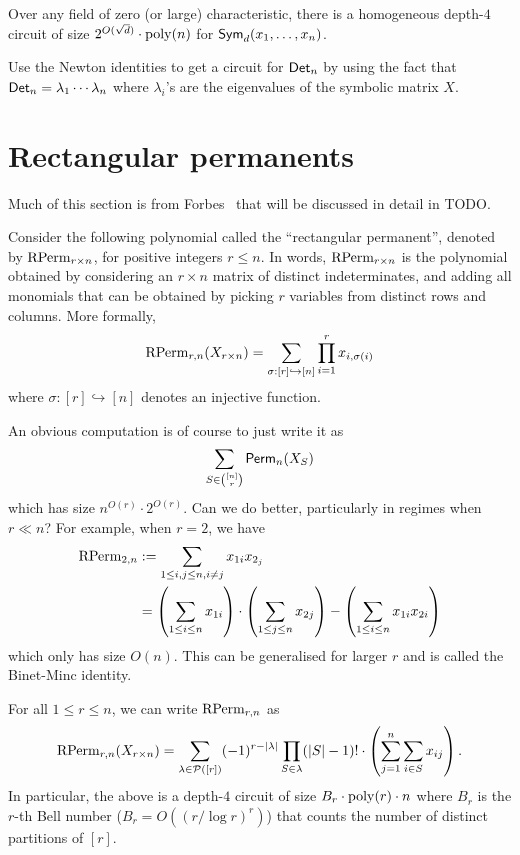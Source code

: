 \begin{lemma}\label{lem:hom-d4-ckt-esym}
Over any field of zero (or large) characteristic, there is a homogeneous depth-$4$ circuit of size $2^{O(\sqrt{d})} \cdot \operatorname{poly}(n)$ for $\operatorname{\mathsf{Sym}}_d(x_1,\ldots, x_n)$. 
\end{lemma}

\begin{exercise}
Use the Newton identities to get a circuit for $\operatorname{\mathsf{Det}}_n$ by using the fact that $\operatorname{\mathsf{Det}}_n = \lambda_1 \cdots \lambda_n$ where $\lambda_i$'s are the eigenvalues of the symbolic matrix $X$. 
\end{exercise}

\section{Rectangular permanents}

Much of this section is from Forbes~\cite{For24} that will be discussed in detail in TODO. 

Consider the following polynomial called the ``rectangular permanent'', denoted by $\operatorname{\mathrm{RPerm}}_{r\times n}$, for positive integers $r \leq n$. In words, $\operatorname{\mathrm{RPerm}}_{r\times n}$ is the polynomial obtained by considering an $r\times n$ matrix of distinct indeterminates, and adding all monomials that can be obtained by picking $r$ variables from distinct rows and columns. More formally, 
\[
\operatorname{\mathrm{RPerm}}_{r,n}(X_{r\times n}) = \sum_{\sigma: [r] \hookrightarrow [n]} \prod_{i=1}^r x_{i, \sigma(i)}
\]
where $\sigma:[r] \hookrightarrow [n]$ denotes an injective function. 

An obvious computation is of course to just write it as 
\[
\sum_{S \in \binom{[n]}{r}}\operatorname{\mathsf{Perm}}_n(X_S)
\]
which has size $n^{O(r)} \cdot 2^{O(r)}$. Can we do better, particularly in regimes when $r \ll n$? For example, when $r = 2$, we have
\begin{align*}
\operatorname{\mathrm{RPerm}}_{2,n} & := \sum_{1 \leq i,j\leq n, i\neq j} x_{1i} x_{2_j}\\
            &  = \left(\sum_{1 \leq i \leq n} x_{1i}\right) \cdot \left(\sum_{1 \leq j \leq n} x_{2j}\right) - \left(\sum_{1 \leq i \leq n} x_{1i}x_{2i}\right)
\end{align*}
which only has size $O(n)$. This can be generalised for larger $r$ and is called the Binet-Minc identity. 

\begin{lemma}\label{lem:rectangular-perm-computation}
  For all $1 \leq r \leq n$, we can write $\operatorname{\mathrm{RPerm}}_{r,n}$ as
  \[
  \operatorname{\mathrm{RPerm}}_{r,n}(X_{r\times n}) = \sum_{\lambda \in \mathcal{P}([r])} (-1)^{r - \left|\lambda\right|} \prod_{S \in \lambda} (|S| - 1)! \cdot \left(\sum_{j=1}^n \sum_{i\in S} x_{ij}\right). 
  \]
  In particular, the above is a depth-$4$ circuit of size $B_r \cdot \operatorname{poly}(r) \cdot n$ where $B_r$ is the $r$-th Bell number ($B_r = O((r / \log r)^r)$) that counts the number of distinct partitions of $[r]$. 
\end{lemma}

